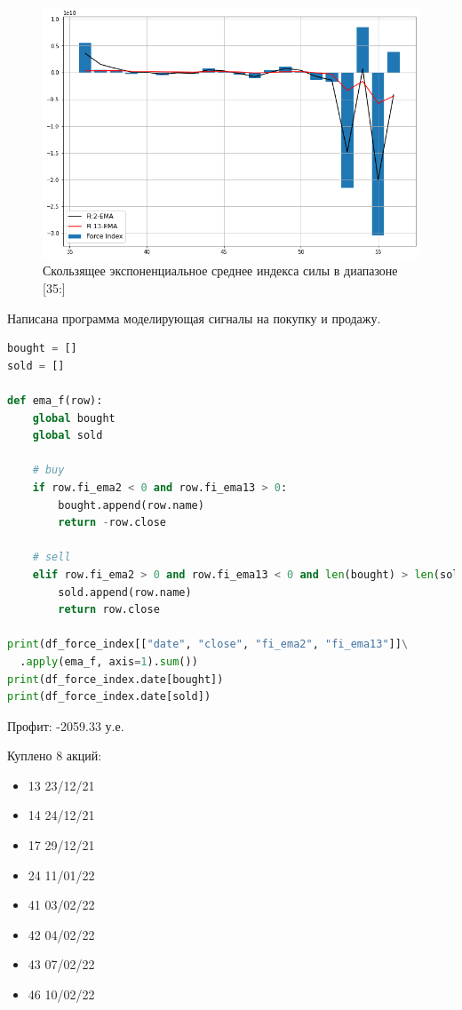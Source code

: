 \documentclass[14pt,a4paper]{extarticle}%
\begin{document}
\begin{figure}[H]
  \centering
  \includegraphics[scale=0.5]{FI_EMA_2.png}
  \caption{Скользящее экспоненциальное среднее индекса силы в диапазоне [35:]}
  \label{fig:FI_EMA_2}
\end{figure}


Написана программа моделирующая сигналы на покупку и продажу.
\begin{lstlisting}[basicstyle=\small, language=Python]
bought = []
sold = []

def ema_f(row):
    global bought
    global sold

    # buy
    if row.fi_ema2 < 0 and row.fi_ema13 > 0:
        bought.append(row.name)
        return -row.close
    
    # sell
    elif row.fi_ema2 > 0 and row.fi_ema13 < 0 and len(bought) > len(sold):
        sold.append(row.name)
        return row.close

print(df_force_index[["date", "close", "fi_ema2", "fi_ema13"]]\
  .apply(ema_f, axis=1).sum())
print(df_force_index.date[bought])
print(df_force_index.date[sold])
\end{lstlisting}

Профит: -2059.33 у.е.

Куплено 8 акций:
\begin{itemize}
  \setlength{\parskip}{0pt}
  \setlength{\itemsep}{0pt plus 1pt}
  \item[] 13    23/12/21
  \item[] 14    24/12/21
  \item[] 17    29/12/21
  \item[] 24    11/01/22
  \item[] 41    03/02/22
  \item[] 42    04/02/22
  \item[] 43    07/02/22
  \item[] 46    10/02/22
\end{itemize}
\end{document}
